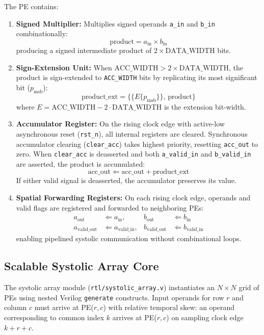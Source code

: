 \documentclass[conference]{IEEEtran}
\begin{document}
The PE contains:
\begin{enumerate}
    \item \textbf{Signed Multiplier:} Multiplies signed operands \texttt{a\_in} and \texttt{b\_in} combinationally:
    \begin{equation}
    \text{product} = a_{\text{in}} \times b_{\text{in}}
    \end{equation}
    producing a signed intermediate product of $2 \times \text{DATA\_WIDTH}$ bits.
    \item \textbf{Sign-Extension Unit:} When $\text{ACC\_WIDTH} > 2 \times \text{DATA\_WIDTH}$, the product is sign-extended to \texttt{ACC\_WIDTH} bits by replicating its most significant bit ($p_{\text{msb}}$):
    \begin{equation}
    \text{product\_ext} = \big\{\{E\{p_{\text{msb}}\}\}, \, \text{product}\big\}
    \end{equation}
    where $E = \text{ACC\_WIDTH} - 2\cdot\text{DATA\_WIDTH}$ is the extension bit-width.
    \item \textbf{Accumulator Register:} On the rising clock edge with active-low asynchronous reset (\texttt{rst\_n}), all internal registers are cleared. Synchronous accumulator clearing (\texttt{clear\_acc}) takes highest priority, resetting \texttt{acc\_out} to zero. When \texttt{clear\_acc} is deasserted and both \texttt{a\_valid\_in} and \texttt{b\_valid\_in} are asserted, the product is accumulated:
    \begin{equation}
    \text{acc\_out} \Leftarrow \text{acc\_out} + \text{product\_ext}
    \end{equation}
    If either valid signal is deasserted, the accumulator preserves its value.
    \item \textbf{Spatial Forwarding Registers:} On each rising clock edge, operands and valid flags are registered and forwarded to neighboring PEs:
    \begin{align}
    a_{\text{out}} &\Leftarrow a_{\text{in}}, & b_{\text{out}} &\Leftarrow b_{\text{in}} \\
    a_{\text{valid\_out}} &\Leftarrow a_{\text{valid\_in}}, & b_{\text{valid\_out}} &\Leftarrow b_{\text{valid\_in}}
    \end{align}
    enabling pipelined systolic communication without combinational loops.
\end{enumerate}

\subsection{Scalable Systolic Array Core}
The systolic array module (\texttt{rtl/systolic\_array.v}) instantiates an $N \times N$ grid of PEs using nested Verilog \texttt{generate} constructs. Input operands for row $r$ and column $c$ must arrive at PE($r, c$) with relative temporal skew: an operand corresponding to common index $k$ arrives at PE($r, c$) on sampling clock edge $k + r + c$.
\end{document}
